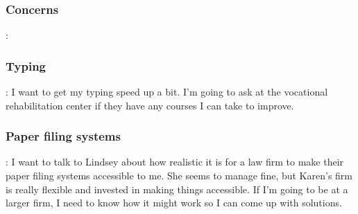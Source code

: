 \subsubsection*{Concerns}:

\subsubsection*{Typing}: I want to get my typing speed up a bit. I'm going to ask at the vocational rehabilitation center if they have any courses I can take to improve.

\subsubsection*{Paper filing systems}: I want to talk to Lindsey about how realistic it is for a law firm to make their paper filing systems accessible to me. She seems to manage fine, but Karen's firm is really flexible and invested in making things accessible. If I'm going to be at a larger firm, I need to know how it might work so I can come up with solutions.

